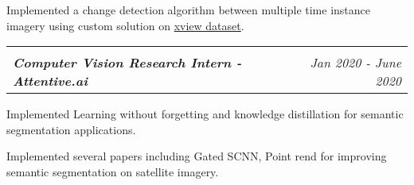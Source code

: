 \documentclass[letterpaper,10.9pt]{article}
\makeatletter
\newcommand{\resumeSubheading}[4]{
  \vspace{-1pt}\item[]
  \begin{tabular*}{0.98\textwidth}{l@{\extracolsep{\fill}}r}
      \hspace{-10pt}\textbf{#1} & #2 \\
      \hspace{-10pt}\textit{\small#3} & \textit{\small #4} \\
    \end{tabular*}\vspace{-5pt}
}
\makeatother
\begin{document}
      \item{
       Implemented a change detection algorithm between multiple time instance imagery using custom solution on \href{http://xviewdataset.org/}{\color{blue}xview dataset}. 
      }
      \vspace{-5pt}
     
  \vspace{-8pt}
    \resumeSubheading
      \small
      \item{\textbf{Computer Vision Research Intern - Attentive.ai}}{Jan 2020 - June 2020}
      \vspace{-5pt}
            \item{
      Implemented Learning without forgetting and knowledge distillation for semantic segmentation applications. 
      }
        \vspace{-5pt}
     
      \item{
      Implemented several papers including Gated SCNN, Point rend for improving semantic segmentation on satellite imagery.
      }
      
     
\end{document}
